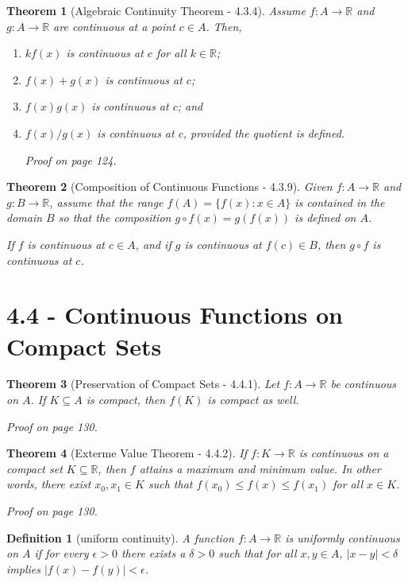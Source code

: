 \documentclass{article}
\newtheorem{definition}{Definition}
\newtheorem{theorem}{Theorem}
\begin{document}
\begin{theorem}[Algebraic Continuity Theorem - 4.3.4]
    Assume $f:A\rightarrow \mathbb{R}$ and $g:A\rightarrow \mathbb{R}$ are continuous at a point $c \in A$. Then,
    \begin{enumerate}
        \item $kf(x)$ is continuous at $c$ for all $k \in \mathbb{R}$;
        \item $f(x) + g(x)$ is continuous at $c$;
        \item $f(x)g(x)$ is continuous at $c$; and
        \item $f(x)/g(x)$ is continuous at $c$, provided the quotient is defined.
        
        Proof on page 124.
    \end{enumerate}
\end{theorem}

\begin{theorem}[Composition of Continuous Functions - 4.3.9]
    Given $f:A\rightarrow \mathbb{R}$ and $g:B\rightarrow \mathbb{R}$, assume that the range $f(A) = \{f(x):x\in A\}$ is contained in the domain $B$ so that the composition $g \circ f(x) = g(f(x))$ is defined on $A$.

    If $f$ is continuous at $c \in A$, and if $g$ is continuous at $f(c) \in B$, then $g \circ f$ is continuous at $c$.
\end{theorem}

\section*{4.4 - Continuous Functions on Compact Sets}
\begin{theorem}[Preservation of Compact Sets - 4.4.1]
    Let $f:A\rightarrow \mathbb{R}$ be continuous on $A$. If $K \subseteq A$ is compact, then $f(K)$ is compact as well.

    Proof on page 130.
\end{theorem}

\begin{theorem}[Exterme Value Theorem - 4.4.2]
    If $f:K\rightarrow \mathbb{R}$ is continuous on a compact set $K \subseteq \mathbb{R}$, then $f$ attains a maximum and minimum value. In other words, there exist $x_0, x_1 \in K$ such that $f(x_0)\leq f(x) \leq f(x_1)$ for all $x \in K$.

    Proof on page 130.
\end{theorem}

\begin{definition}[uniform continuity]
    A function $f:A\rightarrow \mathbb{R}$ is \textit{uniformly continuous} on $A$ if for every $\epsilon > 0$ there exists a $\delta > 0$ such that for all $x,y \in A$, $|x-y|<\delta$ implies $|f(x)-f(y)|<\epsilon$.
\end{definition}
\end{document}
